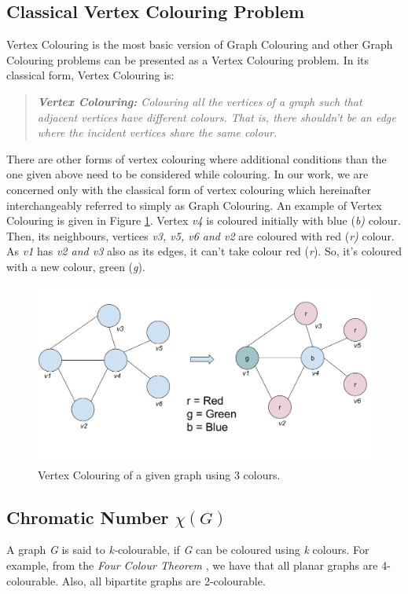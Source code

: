 \documentclass[MTech]{iitmdiss}
\begin{document}
\subsection{Classical Vertex Colouring Problem}
Vertex Colouring is the most basic version of Graph Colouring and other Graph Colouring problems can be presented as a Vertex Colouring problem. In its classical form, Vertex Colouring is:
\begin{verse}
\textit{\textbf{Vertex Colouring:} Colouring all the vertices of a graph such that adjacent vertices have different colours. That is, there shouldn't be an edge where the incident vertices share the same colour.}
\end{verse}
There are other forms of vertex colouring where additional conditions than the one given above need to be considered while colouring. In our work, we are concerned only with the classical form of vertex colouring which hereinafter interchangeably referred to simply as Graph Colouring. An example of Vertex Colouring is given in Figure \ref{fig:colouring}. Vertex \textit{v4} is coloured initially with blue (\textit{b)} colour. Then, its neighbours, vertices \textit{v3, v5, v6 and v2} are coloured with red (\textit{r)} colour. As \textit{v1} has \textit{v2 and v3} also as its edges, it can't take colour red (\textit{r}). So, it's coloured with a new colour, green (\textit{g}).

\begin{figure}[h]
    \centering
    \includegraphics[width=\textwidth,scale=1,keepaspectratio=true]{graphcolouring.jpg}
    \caption{
        Vertex Colouring of a given graph using 3 colours.
    }
    \label{fig:colouring}
\end{figure}



\subsection{Chromatic Number $ \chi(G) $}
A graph \textit{G} is said to \textit{k-}colourable, if \textit{G} can be coloured using \textit{k} colours. For example, from the \textit{Four Colour Theorem} \citep{appel1977, thomas98, wilson14}, we have that all planar graphs are 4-colourable. Also, all bipartite graphs are 2-colourable.
 
\end{document}
